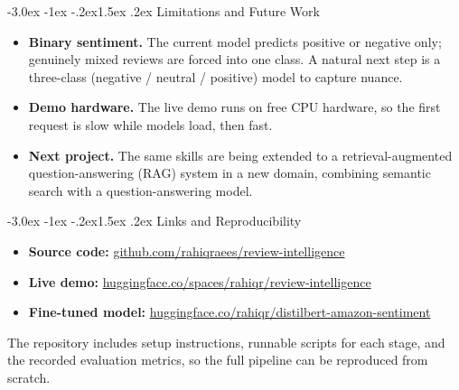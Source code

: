 \documentclass[11pt]{article}
\makeatletter
\renewcommand{\section}{\@startsection{section}{1}{\z@}%
  {-3.0ex \@plus -1ex \@minus -.2ex}{1.5ex \@plus.2ex}%
  {\Large\bfseries\color{primarycolor}}}
\makeatother
\begin{document}
\section{Limitations and Future Work}

\begin{itemize}
    \item \textbf{Binary sentiment.} The current model predicts positive or
    negative only; genuinely mixed reviews are forced into one class. A natural
    next step is a three-class (negative / neutral / positive) model to capture
    nuance.
    \item \textbf{Demo hardware.} The live demo runs on free CPU hardware, so the
    first request is slow while models load, then fast.
    \item \textbf{Next project.} The same skills are being extended to a
    retrieval-augmented question-answering (RAG) system in a new domain,
    combining semantic search with a question-answering model.
\end{itemize}

\section{Links and Reproducibility}

\begin{itemize}
    \item \textbf{Source code:}
    \href{https://github.com/rahiqraees/review-intelligence}{github.com/rahiqraees/review-intelligence}
    \item \textbf{Live demo:}
    \href{https://huggingface.co/spaces/rahiqr/review-intelligence}{huggingface.co/spaces/rahiqr/review-intelligence}
    \item \textbf{Fine-tuned model:}
    \href{https://huggingface.co/rahiqr/distilbert-amazon-sentiment}{huggingface.co/rahiqr/distilbert-amazon-sentiment}
\end{itemize}

The repository includes setup instructions, runnable scripts for each stage, and
the recorded evaluation metrics, so the full pipeline can be reproduced from
scratch.
\end{document}
